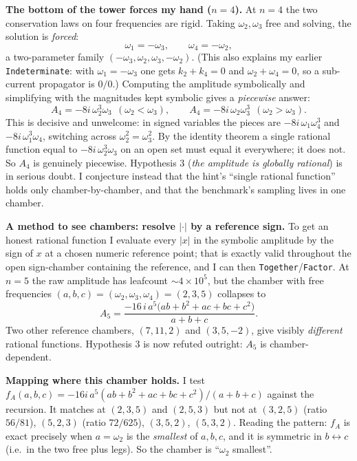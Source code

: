 \documentclass[11pt]{article}
\begin{document}
\medskip
\noindent\textbf{The bottom of the tower forces my hand ($n=4$).}
At $n=4$ the two conservation laws on four frequencies are rigid. Taking $\omega_2,\omega_3$
free and solving, the solution is \emph{forced}:
\[
\omega_1=-\omega_3,\qquad \omega_4=-\omega_2,
\]
a two-parameter family $(-\omega_3,\omega_2,\omega_3,-\omega_2)$. (This also explains my
earlier \texttt{Indeterminate}: with $\omega_1=-\omega_3$ one gets $k_2+k_4=0$ and
$\omega_2+\omega_4=0$, so a sub-current propagator is $0/0$.) Computing the amplitude
symbolically and simplifying with the magnitudes kept symbolic gives a \emph{piecewise}
answer:
\[
A_4=-8i\,\omega_2^3\omega_3\ \ (\omega_2<\omega_3),\qquad
A_4=-8i\,\omega_2\omega_3^3\ \ (\omega_2>\omega_3).
\]
This is decisive and unwelcome: in signed variables the pieces are
$-8i\,\omega_1\omega_4^3$ and $-8i\,\omega_1^3\omega_4$, switching across
$\omega_2^2=\omega_3^2$. By the identity theorem a single rational function equal to
$-8i\,\omega_2^3\omega_3$ on an open set must equal it everywhere; it does not. So $A_4$ is
genuinely piecewise. Hypothesis 3 (\emph{the amplitude is globally rational}) is in serious
doubt. I conjecture instead that the hint's ``single rational function'' holds only
chamber-by-chamber, and that the benchmark's sampling lives in one chamber.

\medskip
\noindent\textbf{A method to see chambers: resolve $|\cdot|$ by a reference sign.}
To get an honest rational function I evaluate every $|x|$ in the symbolic amplitude by the
sign of $x$ at a chosen numeric reference point; that is exactly valid throughout the open
sign-chamber containing the reference, and I can then \texttt{Together}/\texttt{Factor}. At
$n=5$ the raw amplitude has leafcount $\sim4\times10^5$, but the chamber with free
frequencies $(a,b,c)=(\omega_2,\omega_3,\omega_4)=(2,3,5)$ collapses to
\[
A_5=\frac{-16\,i\,a^5\bigl(ab+b^2+ac+bc+c^2\bigr)}{a+b+c}.
\]
Two other reference chambers, $(7,11,2)$ and $(3,5,-2)$, give visibly \emph{different}
rational functions. Hypothesis 3 is now refuted outright: $A_5$ is chamber-dependent.

\medskip
\noindent\textbf{Mapping where this chamber holds.}
I test $f_A(a,b,c)=-16i\,a^5(ab+b^2+ac+bc+c^2)/(a+b+c)$ against the recursion. It matches at
$(2,3,5)$ and $(2,5,3)$ but not at $(3,2,5)$ (ratio $56/81$), $(5,2,3)$ (ratio $72/625$),
$(3,5,2)$, $(5,3,2)$. Reading the pattern: $f_A$ is exact precisely when $a=\omega_2$ is the
\emph{smallest} of $a,b,c$, and it is symmetric in $b\leftrightarrow c$ (i.e.\ in the two
free plus legs). So the chamber is ``$\omega_2$ smallest''.
\end{document}
